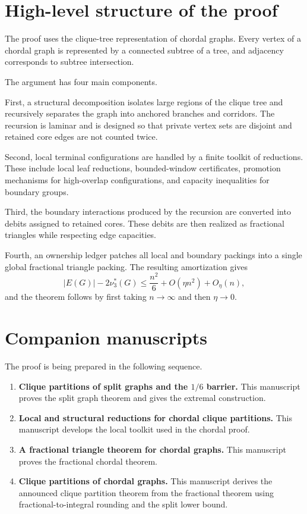 \documentclass[11pt]{article}
\begin{document}
\section{High-level structure of the proof}

The proof uses the clique-tree representation of chordal graphs. Every vertex of a chordal graph is represented by a connected subtree of a tree, and adjacency corresponds to subtree intersection.

The argument has four main components.

First, a structural decomposition isolates large regions of the clique tree and recursively separates the graph into anchored branches and corridors. The recursion is laminar and is designed so that private vertex sets are disjoint and retained core edges are not counted twice.

Second, local terminal configurations are handled by a finite toolkit of reductions. These include local leaf reductions, bounded-window certificates, promotion mechanisms for high-overlap configurations, and capacity inequalities for boundary groups.

Third, the boundary interactions produced by the recursion are converted into debits assigned to retained cores. These debits are then realized as fractional triangles while respecting edge capacities.

Fourth, an ownership ledger patches all local and boundary packings into a single global fractional triangle packing. The resulting amortization gives
\[
    |E(G)|-2\nu_3^*(G)
    \le
    \frac{n^2}{6}+O(\eta n^2)+O_\eta(n),
\]
and the theorem follows by first taking \(n\to\infty\) and then \(\eta\to0\).

\section{Companion manuscripts}

The proof is being prepared in the following sequence.

\begin{enumerate}[label=(\Alph*)]
    \item \textbf{Clique partitions of split graphs and the \(1/6\) barrier.}
    This manuscript proves the split graph theorem and gives the extremal construction.
    \item \textbf{Local and structural reductions for chordal clique partitions.}
    This manuscript develops the local toolkit used in the chordal proof.
    \item \textbf{A fractional triangle theorem for chordal graphs.}
    This manuscript proves the fractional chordal theorem.
    \item \textbf{Clique partitions of chordal graphs.}
    This manuscript derives the announced clique partition theorem from the fractional theorem using fractional-to-integral rounding and the split lower bound.
\end{enumerate}
\end{document}
